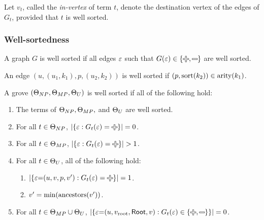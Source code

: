 Let $v_t$, called the \emph{in-vertex} of term $t$,
denote the destination vertex of the edges of $G_t$,
provided that $t$ is well sorted.


\subsubsection{Well-sortedness}

\begin{definition}
  A graph $G$ is well sorted if all edges $\e$ such that $G(\e) \in \{\Plus, \Minus\}$ are well sorted.
\end{definition}

\begin{definition}
  An edge $(u, (u_1, k_1), p, (u_2, k_2))$ is well sorted if $(p, \sort{k_2}) \in \arity{k_1}$.
\end{definition}

\begin{definition}
  A grove $(\Set[NP], \Set[MP], \Set[U])$ is well sorted if all of the following hold:
  \begin{enumerate}
    \item The terms of $\Set[NP], \Set[MP],$ and $\Set[U]$ are well sorted.
    \item For all $t \in \Set[NP]$,
      $\SizeOf{\SetOf{\e \SuchThat{G_t(\e) = \Plus}}} = 0$.
    \item For all $t \in \Set[MP]$,
      $\SizeOf{\SetOf{\e \SuchThat{G_t(\e) = \Plus}}} > 1$.
    \item For all $t \in \Set[U]$, all of the following hold:
      \begin{enumerate}
        \item $\SizeOf{\SetOf{\e{=}(u, v, p, v') \SuchThat{G_t(\e) = \Plus}}} = 1$.
        \item $v' = \min{\ancestors{v'}}$.
      \end{enumerate}
    \item For all $t \in \Set[MP] \cup \Set[U]$,
      $\SizeOf{\SetOf{\e{=}(u, \rootVertex, \Root, v) \SuchThat{G_t(\e) \in \SetOf{\Plus, \Minus}}}} = 0$.
  \end{enumerate}
\end{definition}

